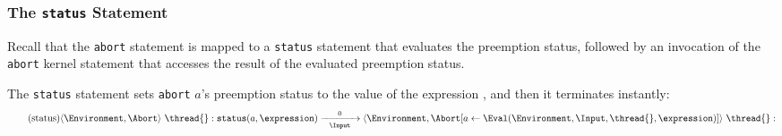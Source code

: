 \subsubsection{The \texttt{status} Statement}
Recall that the \texttt{abort} statement is mapped to a \texttt{status}
statement that evaluates the preemption status, followed by an invocation
of the \texttt{abort} kernel statement that accesses the result of the
evaluated preemption status.

The \verb$status$ statement sets \verb$abort$ $a$'s preemption status
to the value of the expression \expression{}, and then it terminates
instantly:
\begin{equation*}
	\tag{status}
	\label{forec:status}
	\langle \Environment, \Abort \rangle ~ \thread{}:\mathtt{status}(a, \expression)
		\xrightarrow[~~\Input~~]{0} 
	\langle \Environment, \Abort[a \gets \Eval(\Environment, \Input, \thread{}, \expression)] \rangle ~ \thread{}:
\end{equation*}

